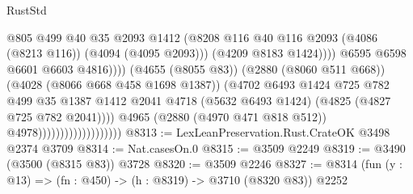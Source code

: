 \begin{lexlean}{RustStd}
\begin{coremodule}
                                                          @805
                                                          @499
                                                          @40
                                                          @35
                                                          @2093
                                                          @1412
                                                          (@8208
                                                            @116
                                                            @40
                                                            @116
                                                            @2093
                                                            (@4086 (@8213 @116))
                                                            (@4094 (@4095 @2093)))
                                                          (@4209 @8183 @1424))))
                                                    @6595
                                                    @6598
                                                    @6601
                                                    @6603
                                                    @4816))))
                                            (@4655 (@8055 @83))
                                            (@2880 (@8060 @511 @668))
                                            (@4028 (@8066 @668 @458 @1698 @1387))
                                            (@4702
                                              @6493
                                              @1424
                                              @725
                                              @782
                                              @499
                                              @35
                                              @1387
                                              @1412
                                              @2041
                                              @4718
                                              (@5632 @6493 @1424)
                                              (@4825 (@4827 @725 @782 @2041))))
                                          @4965
                                          (@2880 (@4970 @471 @818 @512))
                                          @4978)))))))))))))))))))
@8313 := LexLeanPreservation.Rust.CrateOK @3498 @2374 @3709
@8314 := Nat.casesOn.{0}
@8315 := @3509 @2249
@8319 := @3490 (@3500 (@8315 @83)) @3728
@8320 := @3509 @2246
@8327 := @8314 (fun (y : @13) => (fn : @450) -> (h : @8319) -> @3710 (@8320 @83)) @2252

\end{coremodule}
\end{lexlean}

